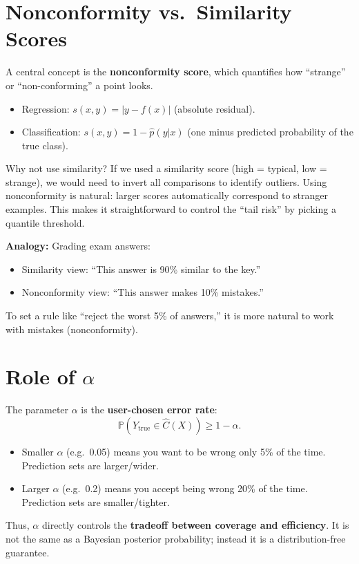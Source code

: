 \documentclass[11pt]{article}
\theoremstyle{remark}
\begin{document}
\section{Nonconformity vs.\ Similarity Scores}
A central concept is the \textbf{nonconformity score}, which quantifies how ``strange'' or ``non-conforming'' a point looks.

\begin{itemize}
    \item Regression: $s(x,y) = |y - f(x)|$ (absolute residual).
    \item Classification: $s(x,y) = 1 - \hat{p}(y|x)$ (one minus predicted probability of the true class).
\end{itemize}

Why not use similarity?
If we used a similarity score (high = typical, low = strange), we would need to invert all comparisons to identify outliers.
Using nonconformity is natural: larger scores automatically correspond to stranger examples.
This makes it straightforward to control the ``tail risk'' by picking a quantile threshold.

\bigskip
\noindent \textbf{Analogy:}
Grading exam answers:
\begin{itemize}
    \item Similarity view: ``This answer is 90\% similar to the key.''
    \item Nonconformity view: ``This answer makes 10\% mistakes.''
\end{itemize}
To set a rule like ``reject the worst 5\% of answers,'' it is more natural to work with mistakes (nonconformity).

\section{Role of $\alpha$}
The parameter $\alpha$ is the \textbf{user-chosen error rate}:
\[
\mathbb{P}\!\left( Y_{\text{true}} \in \hat{C}(X) \right) \geq 1-\alpha.
\]

\begin{itemize}
    \item Smaller $\alpha$ (e.g.\ 0.05) means you want to be wrong only 5\% of the time. Prediction sets are larger/wider.
    \item Larger $\alpha$ (e.g.\ 0.2) means you accept being wrong 20\% of the time. Prediction sets are smaller/tighter.
\end{itemize}

Thus, $\alpha$ directly controls the \textbf{tradeoff between coverage and efficiency}.
It is not the same as a Bayesian posterior probability; instead it is a distribution-free guarantee.
\end{document}
